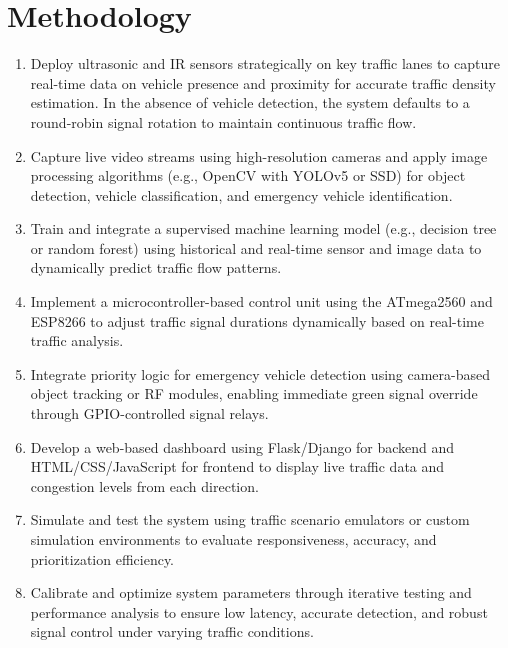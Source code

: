 \section{Methodology}
\begin{enumerate}
\item Deploy ultrasonic and IR sensors strategically on key traffic lanes to capture real-time data on vehicle presence and proximity for accurate traffic density estimation. In the absence of vehicle detection, the system defaults to a round-robin signal rotation to maintain continuous traffic flow.

\item Capture live video streams using high-resolution cameras and apply image processing algorithms (e.g., OpenCV with YOLOv5 or SSD) for object detection, vehicle classification, and emergency vehicle identification.

\item Train and integrate a supervised machine learning model (e.g., decision tree or random forest) using historical and real-time sensor and image data to dynamically predict traffic flow patterns.

\item Implement a microcontroller-based control unit using the ATmega2560 and ESP8266 to adjust traffic signal durations dynamically based on real-time traffic analysis.

\item Integrate priority logic for emergency vehicle detection using camera-based object tracking or RF modules, enabling immediate green signal override through GPIO-controlled signal relays.

\item Develop a web-based dashboard using Flask/Django for backend and HTML/CSS/JavaScript for frontend to display live traffic data and congestion levels from each direction.

\item Simulate and test the system using traffic scenario emulators or custom simulation environments to evaluate responsiveness, accuracy, and prioritization efficiency.

\item Calibrate and optimize system parameters through iterative testing and performance analysis to ensure low latency, accurate detection, and robust signal control under varying traffic conditions.
\end{enumerate}

